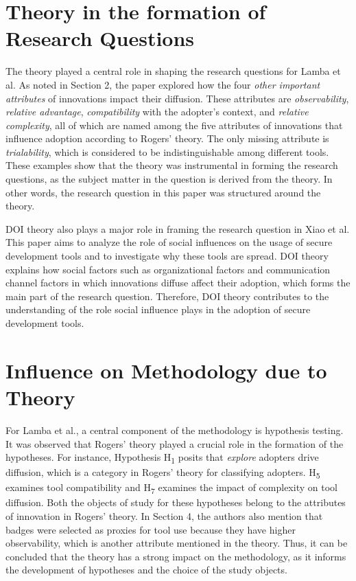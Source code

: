 \documentclass[journal,12pt,onecolumn,]{IEEEtran}
\begin{document}
\section{Theory in the formation of Research Questions}
The theory played a central role in shaping the research questions for Lamba et al. As noted in Section 2, the paper explored how the four \textit{other important attributes} of innovations impact their diffusion.
These attributes are \textit{observability}, \textit{relative advantage}, \textit{compatibility} with the adopter's context, and \textit{relative complexity}, all of which are named among the five attributes of innovations that influence adoption according to Rogers' theory. The only missing attribute is \textit{trialability}, which is considered to be indistinguishable among different tools.
These examples show that the theory was instrumental in forming the research questions, as the subject matter in the question is derived from the theory. In other words, the research question in this paper was structured around the theory.

DOI theory also plays a major role in framing the research question in Xiao et al. This paper aims to analyze the role of social influences on the usage of secure development tools and to investigate why these tools are spread. DOI theory explains how social factors such as organizational factors and communication channel factors in which innovations diffuse affect their adoption,
which forms the main part of the research question. Therefore, DOI theory contributes to the understanding of the role social influence plays in the adoption of secure development tools.
\section{Influence on Methodology due to Theory}
For Lamba et al., a central component of the methodology is hypothesis testing. It was observed that Rogers' theory played a crucial role in the formation of the hypotheses.
For instance, Hypothesis H\textsubscript{1}  posits that \textit{explore} adopters drive diffusion, which is a category in Rogers' theory for classifying adopters.
H\textsubscript{5} examines tool compatibility and H\textsubscript{7} examines the impact of complexity on tool diffusion. Both the objects of study for these hypotheses belong to the attributes of innovation in Rogers' theory.
In Section 4, the authors also mention that badges were selected as proxies for tool use because they have higher observability, which is another attribute mentioned in the theory.
Thus, it can be concluded that the theory has a strong impact on the methodology, as it informs the development of hypotheses and the choice of the study objects.
\end{document}
